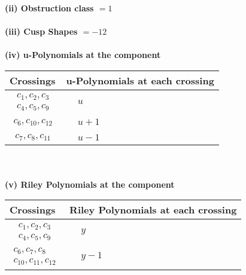 \documentclass[1p]{elsarticle_modified}
\theoremstyle{definition}
\begin{document}
\flushleft \textbf{(ii) Obstruction class $= 1$}\\~\\
\flushleft \textbf{(iii) Cusp Shapes $= -12$}\\~\\
\newpage\renewcommand{\arraystretch}{1}
\flushleft \textbf{(iv) u-Polynomials at the component}\newline \\
\begin{tabular}{m{50pt}|m{274pt}}
Crossings & \hspace{64pt}u-Polynomials at each crossing \\
\hline $$\begin{aligned}c_{1},c_{2},c_{3}\\c_{4},c_{5},c_{9}\end{aligned}$$&$\begin{aligned}
&u
\end{aligned}$\\
\hline $$\begin{aligned}c_{6},c_{10},c_{12}\end{aligned}$$&$\begin{aligned}
&u+1
\end{aligned}$\\
\hline $$\begin{aligned}c_{7},c_{8},c_{11}\end{aligned}$$&$\begin{aligned}
&u-1
\end{aligned}$\\
\hline
\end{tabular}\\~\\
\newpage\renewcommand{\arraystretch}{1}
\flushleft \textbf{(v) Riley Polynomials at the component}\newline \\
\begin{tabular}{m{50pt}|m{274pt}}
Crossings & \hspace{64pt}Riley Polynomials at each crossing \\
\hline $$\begin{aligned}c_{1},c_{2},c_{3}\\c_{4},c_{5},c_{9}\end{aligned}$$&$\begin{aligned}
&y
\end{aligned}$\\
\hline $$\begin{aligned}c_{6},c_{7},c_{8}\\c_{10},c_{11},c_{12}\end{aligned}$$&$\begin{aligned}
&y-1
\end{aligned}$\\
\hline
\end{tabular}\\~\\
\end{document}
